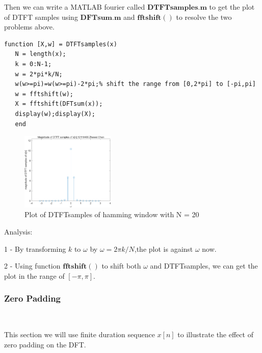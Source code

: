 \documentclass[journal]{IEEEtran}
\begin{document}
Then we can write a MATLAB fourier called $\mathbf{DTFTsamples.m}$ to get the plot of DTFT samples using $\mathbf{DFTsum.m}$ and $\mathbf{fftshift()}$ to resolve the two problems above.

\begin{lstlisting}[title={DTFTsamples.m},style=Matlab-editor]
   function [X,w] = DTFTsamples(x)
   N = length(x);
   k = 0:N-1;
   w = 2*pi*k/N;
   w(w>=pi)=w(w>=pi)-2*pi;% shift the range from [0,2*pi] to [-pi,pi]
   w = fftshift(w);
   X = fftshift(DFTsum(x));
   display(w);display(X);
   end 
\end{lstlisting}

\begin{figure}[H]
   \centering  
   \includegraphics[width=0.4\textwidth]{522.png} %
\caption{  Plot of DTFTsamples of hamming window with N = 20}
   \label{fig:2}
 \end{figure}

\textcolor[rgb]{0,0.6,1}{Analysis:}

\textcolor[rgb]{0,0.6,1}{1 -} By transforming $k$ to $\omega$ by $\omega =2\pi k/N$,the plot is against $\omega$ now.

\textcolor[rgb]{0,0.6,1}{2 -} Using function $\mathbf{fftshift()}$ to shift both $\omega$ and DTFTsamples, we can get the plot in the range of $[-\pi,\pi]$.


\subsubsection{Zero Padding}
 $~$

This section we will use finite duration sequence $x[n]$ to illustrate the effect of zero padding on the DFT.
\end{document}
